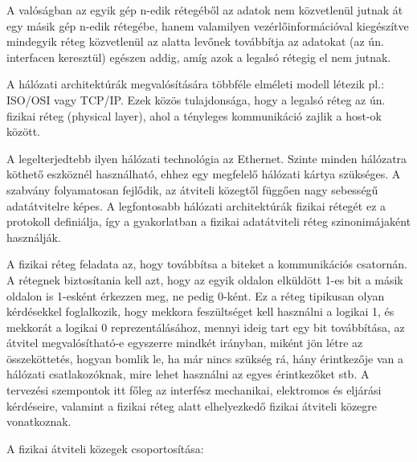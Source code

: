 \documentclass[12pt]{article}
\theoremstyle{plain}
\begin{document}
A valóságban az egyik gép n-edik rétegéből az adatok nem közvetlenül jutnak át egy másik gép n-edik rétegébe, hanem valamilyen vezérlőinformációval kiegészítve mindegyik réteg közvetlenül az alatta levőnek továbbítja az adatokat (az ún. interfacen keresztül) egészen addig, amíg azok a legalsó rétegig el nem jutnak. \\ \par
A hálózati architektúrák megvalósítására többféle elméleti modell létezik pl.: ISO/OSI vagy TCP/IP. Ezek közös tulajdonsága, hogy a legalsó réteg az ún. fizikai réteg (physical layer), ahol a tényleges kommunikáció zajlik a host-ok között. \\ \par
A legelterjedtebb ilyen hálózati technológia az Ethernet. Szinte minden hálózatra köthető eszköznél használható, ehhez egy megfelelő hálózati kártya szükséges. A szabvány folyamatosan fejlődik, az átviteli közegtől függően nagy sebességű adatátvitelre képes. A legfontosabb hálózati architektúrák fizikai rétegét ez a protokoll definiálja, így a gyakorlatban a fizikai adatátviteli réteg szinonimájaként használják.
\\ \par
A fizikai réteg feladata az, hogy továbbítsa a biteket a kommunikációs csatornán. A rétegnek biztosítania kell azt, hogy az egyik oldalon elküldött 1-es bit a másik oldalon is 1-esként érkezzen meg, ne pedig 0-ként. Ez a réteg tipikusan olyan kérdésekkel foglalkozik, hogy mekkora feszültséget kell használni a logikai 1, és mekkorát a logikai 0 reprezentálásához, mennyi ideig tart egy bit továbbítása, az átvitel megvalósítható-e egyszerre mindkét irányban, miként jön létre az összeköttetés, hogyan bomlik le, ha már nincs szükség rá, hány érintkezője van a hálózati csatlakozóknak, mire lehet használni az egyes érintkezőket stb. A tervezési szempontok itt főleg az interfész mechanikai, elektromos és eljárási kérdéseire, valamint a fizikai réteg alatt elhelyezkedő fizikai átviteli közegre vonatkoznak.
\\ \par
A fizikai átviteli közegek csoportosítása:
\end{document}
